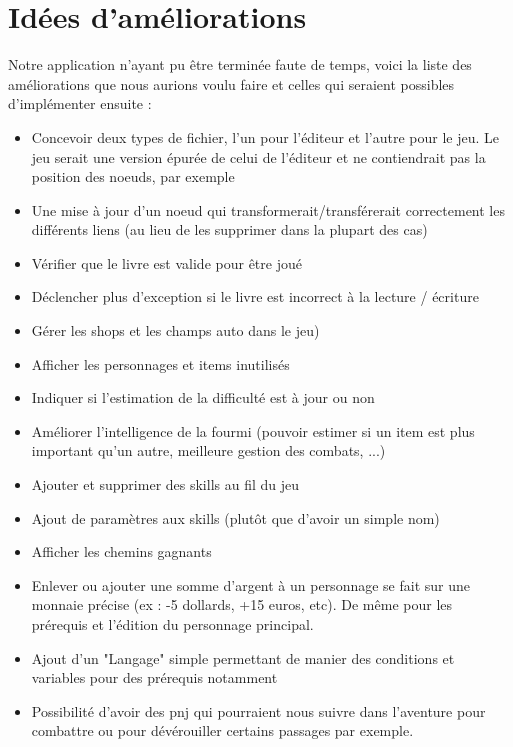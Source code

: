 	\section{Idées d'améliorations}

		Notre application n'ayant pu être terminée faute de temps, voici la liste des améliorations que nous aurions voulu faire et celles qui seraient possibles d'implémenter ensuite :

		\begin{itemize}
			\item{Concevoir deux types de fichier, l'un pour l'éditeur et l'autre pour le jeu. Le jeu serait une version épurée de celui de l'éditeur et ne contiendrait pas la position des noeuds, par exemple}
			\item{Une mise à jour d'un noeud qui transformerait/transférerait correctement les différents liens (au lieu de les supprimer dans la plupart des cas)}
			\item{Vérifier que le livre est valide pour être joué}
			\item{Déclencher plus d'exception si le livre est incorrect à la lecture / écriture}
			\item{Gérer les shops et les champs auto dans le jeu)}
			\item{Afficher les personnages et items inutilisés}
			\item{Indiquer si l'estimation de la difficulté est à jour ou non}
			\item{Améliorer l'intelligence de la fourmi (pouvoir estimer si un item est plus important qu'un autre, meilleure gestion des combats, ...)}
			\item{Ajouter et supprimer des skills au fil du jeu}
			\item{Ajout de paramètres aux skills (plutôt que d'avoir un simple nom)}
			\item{Afficher les chemins gagnants}
			\item{Enlever ou ajouter une somme d'argent à un personnage se fait sur une monnaie précise (ex : -5 dollards, +15 euros, etc). De même pour les prérequis et l'édition du personnage principal.}
			\item{Ajout d'un "Langage" simple permettant de manier des conditions et variables pour des prérequis notamment}
			\item{Possibilité d'avoir des pnj qui pourraient nous suivre dans l'aventure pour combattre ou pour dévérouiller certains passages par exemple.}
		\end{itemize}

